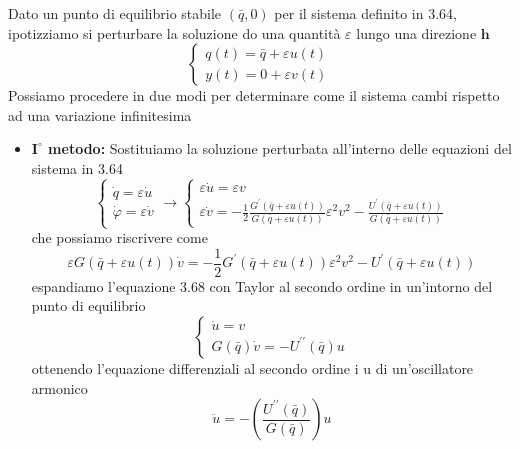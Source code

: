 Dato un punto di equilibrio stabile $(\bar{q},0)$ per il sistema definito in 3.64, ipotizziamo si perturbare la soluzione do una quantit\`{a} $\varepsilon$ lungo una direzione $\bm{h}$
\begin{equation}
\left\{\begin{array}{l}
q(t)=\bar{q}+\varepsilon u(t) \\
y(t)=0+\varepsilon v(t)
\end{array}\right.
\end{equation}
Possiamo procedere in due modi per determinare come il sistema cambi rispetto ad una variazione infinitesima
\begin{itemize}
	\item \textbf{$\bm{I}^{\circ}$ metodo:} Sostituiamo la soluzione perturbata all'interno delle equazioni del sistema in 3.64
	\begin{equation}
\left\{\begin{array} { l } 
{ \dot { q } = \varepsilon \dot { u } } \\
{ \dot { \varphi } = \varepsilon \dot { v } }
\end{array} \rightarrow \left\{\begin{array}{l}
\varepsilon \dot{u}=\varepsilon v \\
\varepsilon \dot{v}=-\frac{1}{2} \frac{G^{\prime}(\bar{q}+\varepsilon u(t))}{G(\bar{q}+\varepsilon u(t))} \varepsilon^2 v^2-\frac{U^{\prime}(\bar{q}+\varepsilon u(t))}{G(\bar{q}+\varepsilon u(t))}
\end{array}\right.\right.
\end{equation}
che possiamo riscrivere come 
\begin{equation}
\varepsilon G(\bar{q}+\varepsilon u(t)) \dot{v}=-\frac{1}{2} G^{\prime}(\bar{q}+\varepsilon u(t)) \varepsilon^2 v^2-U^{\prime}(\bar{q}+\varepsilon u(t))
\end{equation}
espandiamo l'equazione 3.68 con Taylor al secondo ordine in un'intorno del punto di equilibrio
\begin{equation}
\left\{\begin{array}{l}
\dot{u}=v \\
G(\bar{q}) \dot{v}=-U^{\prime \prime}(\bar{q}) u
\end{array}\right.
\end{equation}
ottenendo l'equazione differenziali al secondo ordine i u di un'oscillatore armonico
\begin{equation}
\ddot{u}=-\left(\frac{U^{\prime \prime}(\bar{q})}{G(\bar{q})}\right)u
\end{equation}

\end{itemize}
